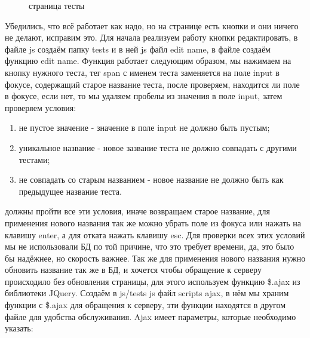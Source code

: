 \documentclass[12pt, oldlfont, amsfonts]{report}
\begin{document}
\begin{figure}[h!]
\caption{страница тесты}
\end{figure}

Убедились, что всё работает как надо, но на странице есть кнопки и они ничего не делают, исправим это. Для начала реализуем работу кнопки редактировать, в файле js создаём папку { tests} и в ней js файл { edit name}, в файле создаём функцию { edit name}. Функция работает следующим образом, мы нажимаем на кнопку нужного теста, тег span с именем теста заменяется на поле input в фокусе, содержащий старое название теста, после проверяем, находится ли поле в фокусе, если нет, то мы удаляем пробелы из значения в поле input, затем проверяем условия: 
\begin{enumerate}
\item { не пустое значение} - значение в поле input не должно быть пустым;
\item { уникальное название} - новое зазвание теста не должно совпадать с другими тестами;
\item { не совпадать со старым названием} - новое название не должно быть как предыдущее название теста.
\end{enumerate}

должны пройти все эти условия, иначе возвращаем старое название, для применения нового названия так же можно убрать поле из фокуса или нажать на клавишу { enter}, а для отката нажать клавишу { esc}. Для проверки всех этих условий мы не использовали БД по той причине, что это требует времени, да, это было бы надёжнее, но скорость важнее. Так же для применения нового названия нужно обновить название так же в БД, и хочется чтобы обращение к серверу происходило без обновления страницы, для этого используем функцию  { \$.ajax} из библиотеки { JQuery}. Создаём в { js/tests} js файл { scripts ajax}, в нём мы храним функции с { \$.ajax} для обращения к серверу, эти функции находятся в другом файле для удобства обслуживания. Ajax имеет параметры, которые необходимо указать:
\end{document}
